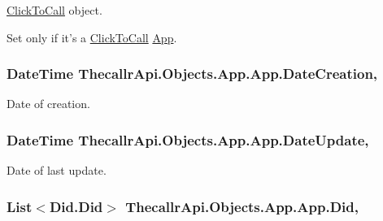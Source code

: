 \hyperlink{namespace_thecallr_api_1_1_objects_1_1_click_to_call}{Click\+To\+Call} object. 

Set only if it's a \hyperlink{namespace_thecallr_api_1_1_objects_1_1_click_to_call}{Click\+To\+Call} \hyperlink{class_thecallr_api_1_1_objects_1_1_app_1_1_app}{App}.\hypertarget{class_thecallr_api_1_1_objects_1_1_app_1_1_app_a3f53bb7ab63063db2e9fe82aa48c7d45}{
\subsubsection[{Date\+Creation}]{\setlength{\rightskip}{0pt plus 5cm}Date\+Time Thecallr\+Api.\+Objects.\+App.\+App.\+Date\+Creation\hspace{0.3cm}{\ttfamily [get]}, {\ttfamily [set]}}}\label{class_thecallr_api_1_1_objects_1_1_app_1_1_app_a3f53bb7ab63063db2e9fe82aa48c7d45}


Date of creation. 

\hypertarget{class_thecallr_api_1_1_objects_1_1_app_1_1_app_adfa5dc973ed2ea1089cab6853d525028}{
\subsubsection[{Date\+Update}]{\setlength{\rightskip}{0pt plus 5cm}Date\+Time Thecallr\+Api.\+Objects.\+App.\+App.\+Date\+Update\hspace{0.3cm}{\ttfamily [get]}, {\ttfamily [set]}}}\label{class_thecallr_api_1_1_objects_1_1_app_1_1_app_adfa5dc973ed2ea1089cab6853d525028}


Date of last update. 

\hypertarget{class_thecallr_api_1_1_objects_1_1_app_1_1_app_a4583c5a48e6905278027f55b8fdccc1c}{
\subsubsection[{Did}]{\setlength{\rightskip}{0pt plus 5cm}List$<${\bf Did.\+Did}$>$ Thecallr\+Api.\+Objects.\+App.\+App.\+Did\hspace{0.3cm}{\ttfamily [get]}, {\ttfamily [set]}}}\label{class_thecallr_api_1_1_objects_1_1_app_1_1_app_a4583c5a48e6905278027f55b8fdccc1c}


